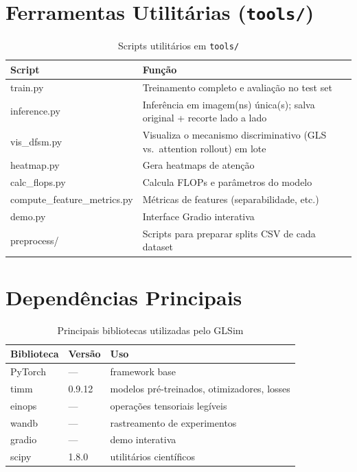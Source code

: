 \documentclass[a4paper,12pt]{scrartcl}
\begin{document}
\section{Ferramentas Utilit\'arias (\texttt{tools/})}

\begin{table}[h!]
  \centering
  \caption{Scripts utilit\'arios em \texttt{tools/}}
  \begin{tabular}{>{\ttfamily}lp{9cm}}
    \toprule
    \normalfont\textbf{Script} & \textbf{Fun\c{c}\~ao} \\
    \midrule
    train.py                      & Treinamento completo e avalia\c{c}\~ao no test set \\[2pt]
    inference.py                  & Infer\^encia em imagem(ns) \'unica(s); salva original + recorte lado a lado \\[2pt]
    vis\_dfsm.py                  & Visualiza o mecanismo discriminativo (GLS vs.\ attention rollout) em lote \\[2pt]
    heatmap.py                    & Gera heatmaps de aten\c{c}\~ao \\[2pt]
    calc\_flops.py                & Calcula FLOPs e par\^ametros do modelo \\[2pt]
    compute\_feature\_metrics.py  & M\'etricas de features (separabilidade, etc.) \\[2pt]
    demo.py                       & Interface Gradio interativa \\[2pt]
    preprocess/                   & Scripts para preparar splits CSV de cada dataset \\
    \bottomrule
  \end{tabular}
  \label{tab:tools}
\end{table}

\section{Depend\^encias Principais}

\begin{table}[h!]
  \centering
  \caption{Principais bibliotecas utilizadas pelo GLSim}
  \begin{tabular}{lll}
    \toprule
    \textbf{Biblioteca} & \textbf{Vers\~ao} & \textbf{Uso} \\
    \midrule
    PyTorch  & ---    & framework base \\
    timm     & 0.9.12 & modelos pr\'e-treinados, otimizadores, losses \\
    einops   & ---    & opera\c{c}\~oes tensoriais leg\'iveis \\
    wandb    & ---    & rastreamento de experimentos \\
    gradio   & ---    & demo interativa \\
    scipy    & 1.8.0  & utilit\'arios cient\'ificos \\
    \bottomrule
  \end{tabular}
  \label{tab:deps}
\end{table}
\end{document}
